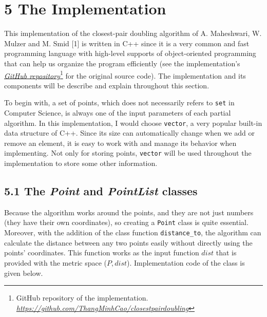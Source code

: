 \documentclass[12pt,english,]{article}
\newcommand{\code}[1]{\colorbox{lbcolor}{\texttt{#1}}}
\begin{document}
\hypertarget{the-implementation}{%
\section{\texorpdfstring{5 \enspace The
Implementation}{5 The Implementation}}\label{the-implementation}}

This implementation of the closest-pair doubling algorithm of A.
Maheshwari, W. Mulzer and M. Smid {[}1{]} is written in C++ since it is
a very common and fast programming language with high-level supports of
object-oriented programming that can help us organize the program
efficiently (see the implementation's
\href{https://github.com/ThangMinhCao/closestpairdoubling}{\emph{GitHub
repository}}\footnote{GitHub repository of the implementation.
  \href{https://github.com/ThangMinhCao/closestpairdoubling}{\emph{https://github.com/ThangMinhCao/closestpairdoubling}}}
for the original source code). The implementation and its components
will be describe and explain throughout this section.

To begin with, a set of points, which does not necessarily refers to
\code{set} in Computer Science, is always one of the input parameters of
each partial algorithm. In this implementation, I would choose
\code{vector}, a very popular built-in data structure of C++. Since its
size can automatically change when we add or remove an element, it is
easy to work with and manage its behavior when implementing. Not only
for storing points, \code{vector} will be used throughout the
implementation to store some other information.

\hypertarget{the-and-classes}{%
\subsection{\texorpdfstring{5.1 The \emph{Point} and \emph{PointList}
classes}{5.1 The  and  classes}}\label{the-and-classes}}

Because the algorithm works around the points, and they are not just
numbers (they have their own coordinates), so creating a \code{Point}
class is quite essential. Moreover, with the addition of the class
function \code{distance\_to}, the algorithm can calculate the distance
between any two points easily without directly using the points'
coordinates. This function works as the input function \(dist\) that is
provided with the metric space (\(P, dist\)). Implementation code of the
class is given below.
\end{document}
